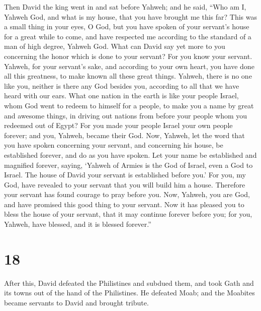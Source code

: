  Then David the king went in and sat before Yahweh; and
he said, ``Who am I, Yahweh God, and what is my house, that you have
brought me this far?  This was a small thing in your
eyes, O God, but you have spoken of your servant's house for a great
while to come, and have respected me according to the standard of a man
of high degree, Yahweh God.  What can David say yet more
to you concerning the honor which is done to your servant? For you know
your servant.  Yahweh, for your servant's sake, and
according to your own heart, you have done all this greatness, to make
known all these great things.  Yahweh, there is no one
like you, neither is there any God besides you, according to all that we
have heard with our ears.  What one nation in the earth
is like your people Israel, whom God went to redeem to himself for a
people, to make you a name by great and awesome things, in driving out
nations from before your people whom you redeemed out of Egypt?
 For you made your people Israel your own people forever;
and you, Yahweh, became their God.  Now, Yahweh, let the
word that you have spoken concerning your servant, and concerning his
house, be established forever, and do as you have spoken.
 Let your name be established and magnified forever,
saying, `Yahweh of Armies is the God of Israel, even a God to Israel.
The house of David your servant is established before you.'
 For you, my God, have revealed to your servant that you
will build him a house. Therefore your servant has found courage to pray
before you.  Now, Yahweh, you are God, and have promised
this good thing to your servant.  Now it has pleased you
to bless the house of your servant, that it may continue forever before
you; for you, Yahweh, have blessed, and it is blessed forever.''

\hypertarget{section-17}{%
\section{18}\label{section-17}}

 After this, David defeated the Philistines and subdued
them, and took Gath and its towns out of the hand of the Philistines.
 He defeated Moab; and the Moabites became servants to
David and brought tribute.

